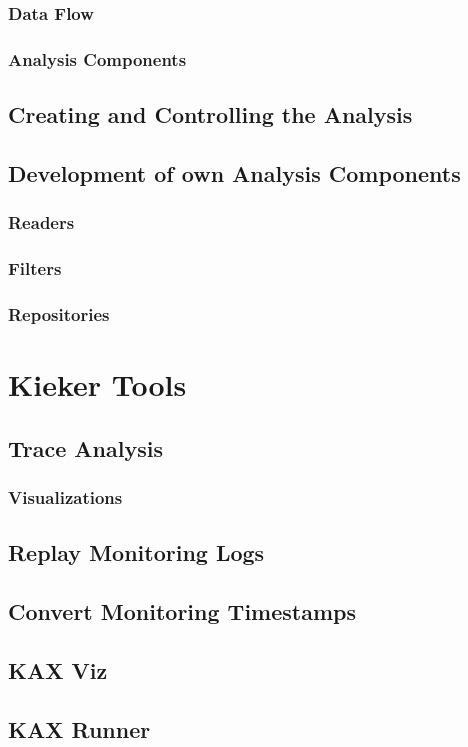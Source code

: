 \documentclass[paper=a4,twoside=false,fontsize=11pt,numbers=noenddot,version=first,bibliography=totoc,headsepline]{scrbook}
\begin{document}
			\subsection{Data Flow}
			\subsection{Analysis Components}
		\section{Creating and Controlling the Analysis}
		\section{Development of own Analysis Components}
			\subsection{Readers}
			\subsection{Filters}
			\subsection{Repositories}

	\chapter{Kieker Tools}\label{chp:Tools}
		\section{Trace Analysis}
			\subsection{Visualizations}
		\section{Replay Monitoring Logs}
		\section{Convert Monitoring Timestamps}
		\section{KAX Viz}
		\section{KAX Runner}
		
\end{document}
